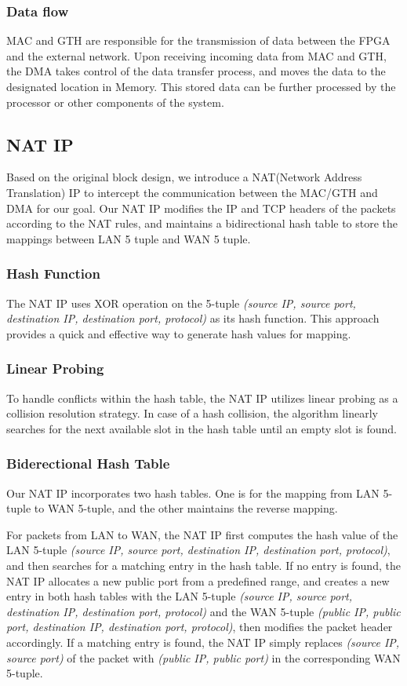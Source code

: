     \subsubsection{Data flow}
    MAC and GTH are responsible for the transmission of data between the FPGA and the external network. Upon receiving incoming data from MAC and GTH, the DMA takes control of the data transfer process, and moves the data to the designated location in Memory. This stored data can be further processed by the processor or other components of the system.

\subsection{NAT IP}

    Based on the original block design, we introduce a NAT(Network Address Translation) IP to intercept the communication between the MAC/GTH and DMA for our goal. Our NAT IP modifies the IP and TCP headers of the packets according to the NAT rules, and maintains a bidirectional hash table to store the mappings between LAN 5 tuple and WAN 5 tuple.

    \subsubsection{Hash Function}
    The NAT IP uses XOR operation on the 5-tuple \emph{(source IP, source port, destination IP, destination port, protocol)} as its hash function. This approach provides a quick and effective way to generate hash values for mapping.

    \subsubsection{Linear Probing}
    To handle conflicts within the hash table, the NAT IP utilizes linear probing as a collision resolution strategy. In case of a hash collision, the algorithm linearly searches for the next available slot in the hash table until an empty slot is found.

    \subsubsection{Biderectional Hash Table}
    Our NAT IP incorporates two hash tables. One is for the mapping from LAN 5-tuple to WAN 5-tuple, and the other maintains the reverse mapping.

    For packets from LAN to WAN, the NAT IP first computes the hash value of the LAN 5-tuple \emph{(source IP, source port, destination IP, destination port, protocol)}, and then searches for a matching entry in the hash table. If no entry is found, the NAT IP allocates a new public port from a predefined range, and creates a new entry in both hash tables with the LAN 5-tuple \emph{(source IP, source port, destination IP, destination port, protocol)} and the WAN 5-tuple \emph{(public IP, public port, destination IP, destination port, protocol)}, then modifies the packet header accordingly. If a matching entry is found, the NAT IP simply replaces \emph{(source IP,  source port)} of the packet with \emph{(public IP, public port)} in the corresponding WAN 5-tuple.

